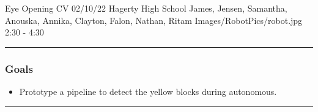 \insertmeeting 
	{Eye Opening CV} 
	{02/10/22} 
	{Hagerty High School}
	{James, Jensen, Samantha, Anouska, Annika, Clayton, Falon, Nathan, Ritam}
	{Images/RobotPics/robot.jpg}
	{2:30 - 4:30}
	
\noindent\hfil\rule{\textwidth}{.4pt}\hfil
\subsubsection*{Goals}
\begin{itemize}
    \item Prototype a pipeline to detect the yellow blocks during autonomous. 

\end{itemize} 

\noindent\hfil\rule{\textwidth}{.4pt}\hfil

